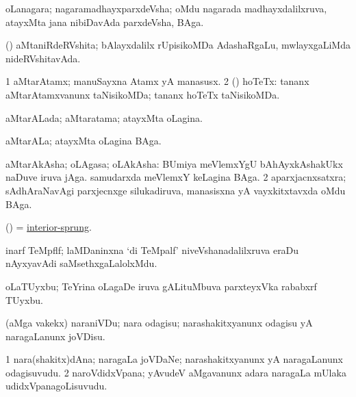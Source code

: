 \bentry
{}
\gl{\nA}
\bmng
oLanagara; nagaramadhayxparxdeVsha; oMdu nagarada madhayxdalilxruva, atayxMta jana nibiDavAda parxdeVsha, BAga. 
\emng
\eentry

\bentry
{}
\gl{\gu}
\bmng
(\mashA) aMtaniRdeRVshita; bAlayxdalilx rUpisikoMDa AdashaRgaLu, mwlayxgaLiMda nideRVshitavAda. 
\emng
\eentry

\bentry
{}
\gl{\nA}
\bmng
\bnum
\num{1} aMtarAtamx; manuSayxna Atamx yA manasusx. 
\num{2} (\hA) hoTeTx:  tananx aMtarAtamxvanunx taNisikoMDa; tananx hoTeTx taNisikoMDa. 
\enum
\emng
\eentry

\bentry
{}
\gl{\gu}
\bmng
aMtarALada; aMtaratama; atayxMta oLagina. 
\emng
\eentry

\bentry
{}
\gl{\nA}
\bmng
aMtarALa; atayxMta oLagina BAga. 
\emng
\eentry

\bentry
{}
\gl{\nA}
\bmng
\bnum
{} aMtarAkAsha; oLAgasa; oLAkAsha: 
\banum
{} BUmiya meVlemxYgU bAhAyxkAshakUkx naDuve iruva jAga. 
 samudarxda meVlemxY keLagina BAga. 
\eanum
\numie
\num{2} aparxjacnxsatxra; sAdhAraNavAgi parxjecnxge silukadiruva, manasisxna yA vayxkitxtavxda oMdu BAga. 
\enum
\emng
\eentry

\bentry
{}
\gl{\gu}
\bmng
(\ame) = \hyperlink{interior-sprung}{interior-sprung}. 
\emng
\eentry

\bentry
{}
\gl{\nA}
\bmng
inarf TeMpflf; laMDaninxna `di TeMpalf' niveVshanadalilxruva eraDu nAyxyavAdi saMsethxgaLalolxMdu. 
\emng
\eentry

\bentry
{}
\gl{\nA}
\bmng
oLaTUyxbu; TeYrina oLagaDe iruva gALituMbuva parxteyxVka rababxrf TUyxbu. 
\emng
\eentry

\bentry
{}
\gl{\sakirx}
\bmng
(aMga \mo vakekx) naraniVDu; nara odagisu; narashakitxyanunx odagisu yA naragaLanunx joVDisu. 
\emng
\eentry

\bentry
{}
\gl{\nA}
\bmng
\bnum
\num{1} nara(shakitx)dAna; naragaLa joVDaNe; narashakitxyanunx yA naragaLanunx odagisuvudu. 
\num{2} naroVdidxVpana; yAvudeV aMgavanunx adara naragaLa mUlaka udidxVpanagoLisuvudu. 
\enum
\emng
\eentry

